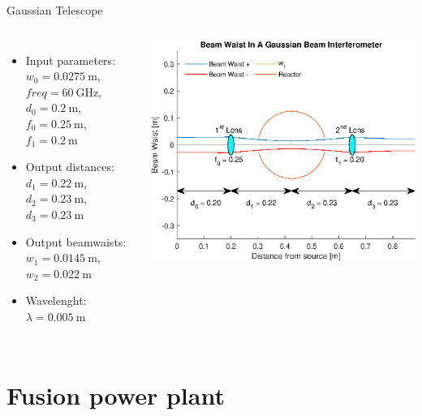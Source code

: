 \documentclass[hyperref={colorlinks=true,urlcolor=blue,linkcolor=.},aspectratio=1610,mathserif]{beamer}
\begin{document}
\begin{frame}{Gaussian Telescope}
	\begin{columns}
		\begin{itemize}
			\item Input parameters:\\
			\(w_0 = \SI{0.0275}{\meter}\), \(freq = \SI{60}{\giga\hertz}\), \(d_0 = \SI{0.2}{\meter}\), \(f_0 = \SI{0.25}{\meter}\), \(f_1 = \SI{0.2}{\meter}\)
			\item Output distances:\\
			\(d_1 = \SI{0.22}{\meter}\), \(d_2 = \SI{0.23}{\meter}\), \(d_3 = \SI{0.23}{\meter}\)
			\item Output beamwaists:\\
			\(w_1 = \SI{0.0145}{\meter}\), \(w_2 = \SI{0.022}{\meter}\)
			\item Wavelenght: \(\lambda = \SI{0.005}{\meter}\)
		\end{itemize}
		\includegraphics[width=\textwidth]{MatlabFigures/Interferometer/Interferometer.eps}
	\end{columns}
\end{frame}





\section{Fusion power plant}
\end{document}

